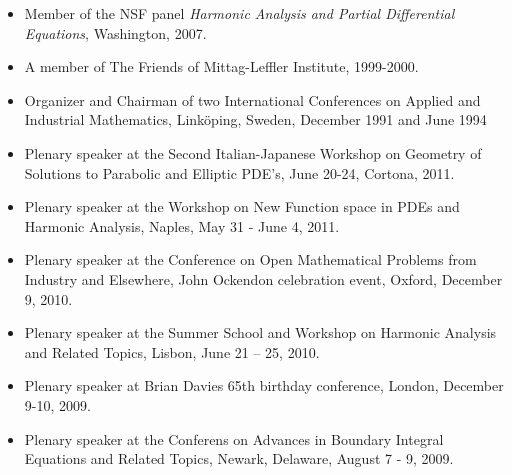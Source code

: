 \documentclass{article}
\begin{document}
\begin{itemize}
\item  Member of the NSF panel {\it Harmonic Analysis and Partial Differential Equations}, Washington, 2007.
\item A member of The Friends of
Mittag-Leffler Institute, 1999-2000.
 \item Organizer and Chairman of two
International Conferences on
  Applied and Industrial Mathematics,
Link\"oping, Sweden, December 1991
  and June 1994

\item Plenary speaker at the Second Italian-Japanese Workshop on Geometry of Solutions to Parabolic and Elliptic PDE's, June 20-24, Cortona, 2011.
 \item Plenary speaker at the Workshop on New Function space in PDEs and Harmonic Analysis, Naples, May 31 - June 4, 2011.
 \item Plenary speaker at the Conference on Open Mathematical Problems from Industry and Elsewhere,  John Ockendon celebration event, Oxford,  December 9,  2010.
  \item  Plenary speaker at the Summer School and Workshop on Harmonic Analysis and Related Topics, Lisbon, June 21 -- 25, 2010.
 \item  Plenary speaker at Brian Davies 65th birthday conference, London, December 9-10, 2009.
 \item  Plenary speaker at the Conferens on Advances in Boundary Integral Equations and Related Topics, Newark, Delaware, August 7 - 9, 2009.


\end{itemize}
\end{document}
